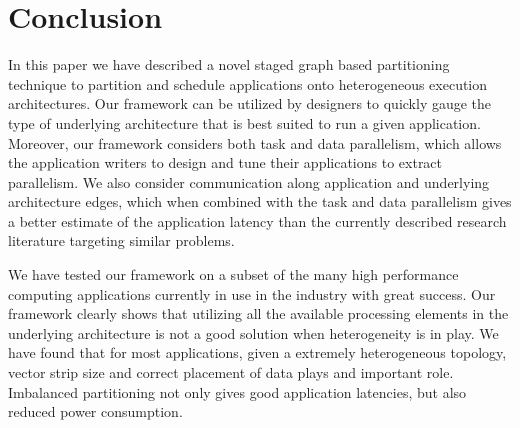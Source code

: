 \documentclass[10pt, conference, compsocconf]{IEEEtran}
\begin{document}








\section{Conclusion}
\label{sec:conclusion}

In this paper we have described a novel staged graph based partitioning
technique to partition and schedule applications onto heterogeneous
execution architectures. Our framework can be utilized by designers to
quickly gauge the type of underlying architecture that is best suited to
run a given application. Moreover, our framework considers both task and
data parallelism, which allows the application writers to design and
tune their applications to extract parallelism. We also consider
communication along application and underlying architecture edges, which
when combined with the task and data parallelism gives a better estimate
of the application latency than the currently described research
literature targeting similar problems.

We have tested our framework on a subset of the many high performance
computing applications currently in use in the industry with great
success. Our framework clearly shows that utilizing all the available
processing elements in the underlying architecture is not a good
solution when heterogeneity is in play. We have found that for most
applications, given a extremely heterogeneous topology, vector strip
size and correct placement of data plays and important role. Imbalanced
partitioning not only gives good application latencies, but also reduced
power consumption.





\end{document}
